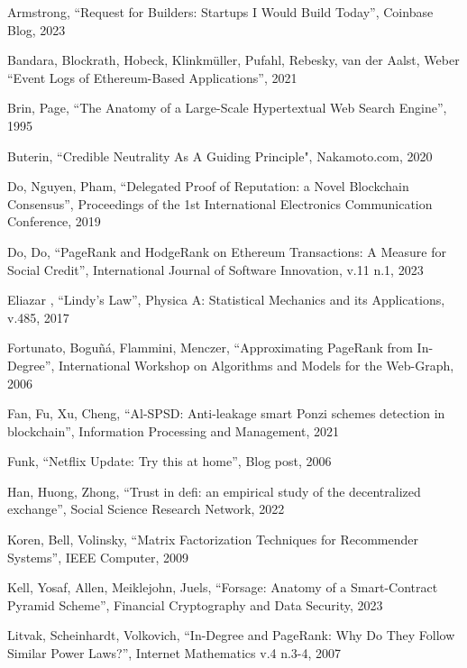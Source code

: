\documentclass[a4paper]{article}
\begin{document}
\begin{thebibliography}{Com79}

 Armstrong, ``Request for Builders: Startups I Would Build Today'', Coinbase Blog, 2023

 Bandara, Blockrath, Hobeck, Klinkmüller, Pufahl, Rebesky, van der Aalst, Weber ``Event Logs of Ethereum-Based Applications'', 2021

 Brin, Page, ``The Anatomy of a Large-Scale Hypertextual Web Search Engine'', 1995

 Buterin, ``Credible Neutrality As A Guiding Principle", Nakamoto.com, 2020

 Do, Nguyen, Pham, ``Delegated Proof of Reputation: a Novel Blockchain Consensus'', Proceedings of the 1st International Electronics Communication Conference, 2019

 Do, Do, ``PageRank and HodgeRank on Ethereum Transactions: A Measure for Social Credit'',  International Journal of Software Innovation, v.11 n.1, 2023

 Eliazar , ``Lindy's Law'', Physica A: Statistical Mechanics and its Applications, v.485, 2017

 Fortunato, Boguñá, Flammini, Menczer, ``Approximating PageRank from In-Degree'', International Workshop on Algorithms and Models for the Web-Graph, 2006

 Fan, Fu, Xu, Cheng, ``Al-SPSD: Anti-leakage smart Ponzi schemes detection in blockchain'', Information Processing and Management, 2021

 Funk, ``Netflix Update: Try this at home'', Blog post, 2006

Han, Huong, Zhong, ``Trust in defi: an empirical study of the decentralized exchange'', Social Science Research Network, 2022

 Koren, Bell, Volinsky, ``Matrix Factorization Techniques for Recommender Systems'', IEEE Computer, 2009

 Kell, Yosaf, Allen, Meiklejohn, Juels, ``Forsage: Anatomy of a Smart-Contract Pyramid Scheme'', Financial Cryptography and Data Security, 2023

 Litvak, Scheinhardt, Volkovich, ``In-Degree and PageRank:
Why Do They Follow Similar Power Laws?'', Internet Mathematics v.4 n.3-4, 2007


\end{thebibliography}
\end{document}
